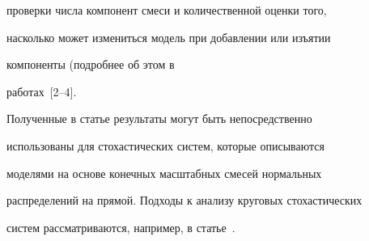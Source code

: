 проверки числа компонент смеси и количественной оценки того,

насколько может измениться модель при добавлении или изъятии

компоненты (подробнее об этом в

работах~[2--4].



Полученные в статье результаты могут быть непосредственно

использованы для стохастических систем, которые описываются

моделями на основе конечных масштабных смесей  нормальных

распределений на прямой. Подходы к анализу круговых стохастических

систем рассматриваются, например, в статье~\cite{Sinitsyn2011}.








